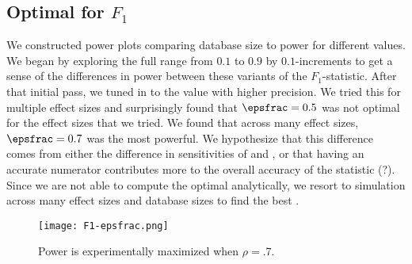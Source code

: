 \subsection{Optimal \epsfrac for $F_{1}$}
We constructed power plots comparing database size to power for different \epsfrac values. We began by exploring the full range from $0.1$ to $0.9$ by $0.1$-increments to get a sense of the differences in power between these variants of the $F_1$-statistic. After that initial pass, we tuned in to the value with higher precision. We tried this for multiple effect sizes and surprisingly found that $\epsfrac = 0.5$ was not optimal for the effect sizes that we tried.  We found that across many effect sizes, $\epsfrac = 0.7$ was the most powerful. We hypothesize that this difference comes from  either the difference in sensitivities of \sa and \se, or that having an accurate numerator contributes more to the overall accuracy of the statistic (?).    Since we are not able to compute the optimal \epsfrac analytically, we resort to simulation across many effect sizes and database sizes to find the best \epsfrac.
\begin{figure}
\centering
\texttt{[image: F1-epsfrac.png]}
\caption{Power is experimentally maximized when $\rho = .7$.}
\end{figure}
 
